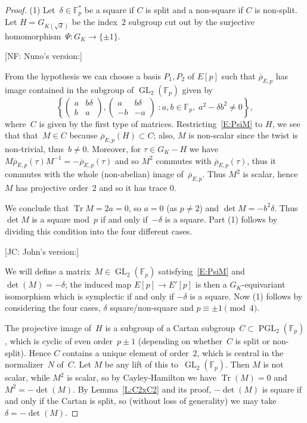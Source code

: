 \documentclass[12pt, reqno]{amsart}
\newcommand{\F}{\mathbb{F}}
\newcommand{\rhobar}{{\overline{\rho}}}
\DeclareMathOperator{\Tr}{Tr}
\newcommand{\GL}{\operatorname{GL}}
\newcommand{\PGL}{\operatorname{PGL}}
\numberwithin{equation}{section}
\theoremstyle{definition}
\theoremstyle{remark}
\newcommand{\nf}[1]{{\color{blue} \textsf{[NF: #1]}}}
\newcommand{\jc}[1]{{\color{darkgreen} \textsf{[JC: #1]}}}
\begin{document}
\begin{proof} (1)
Let~$\delta \in \F_p^*$ be a square if $C$ is split and a non-square
if $C$ is non-split.  Let $H=G_{K(\sqrt{d})}$ be the index~$2$
subgroup cut out by the surjective homomorphism~$\Psi:G_K\to\{\pm1\}$.

\nf{Nuno's version:}

From the hypothesis we can 
choose a basis $P_1, P_2$ of $E[p]$ such that 
$\rhobar_{E,p}$ has image 
contained in the subgroup of $\GL_2(\F_p)$ given by 
\[
\left\{ 
\begin{pmatrix}
a & b\delta \\
b & a
\end{pmatrix}, 
\begin{pmatrix}
a & b\delta \\
-b & -a
\end{pmatrix}  \; : a, b \in \F_p, \; a^2 - \delta b^2 \neq 0 \right\},
\]
where~$C$ is given by the first type of matrices. 
Restricting~\eqref{E:PsiM} to $H$, we see that 
that~$M \in C$ because $\rhobar_{E,p}(H) \subset C$; also, $M$ 
is non-scalar since the twist is non-trivial,
thus~$b \neq 0$. 
Moreover, for $\tau \in G_K - H$ we have 
$M \rhobar_{E,p}(\tau) M^{-1} =-\rhobar_{E,p}(\tau)$ and so $M^2$ commutes with 
$\rhobar_{E,p}(\tau)$, thus it commutes with the whole (non-abelian) image 
of~$\rhobar_{E,p}$. Thus $M^2$ is scalar, hence 
$M$ has projective order~$2$ and so it has trace 0.

We conclude that $\Tr M = 2a = 0$, so $a=0$ (as $p \neq 2$) and $\det
M = -b^2\delta$. Thus $\det M$ is a square mod~$p$ if and only
if~$-\delta$ is a square. Part (1) follows by dividing this condition
into the four different cases.

\jc{John's version:}

We will define a matrix~$M\in\GL_2(\F_p)$ satisfying~\eqref{E:PsiM}
and $\det(M)=-\delta$; the induced map $E[p]\to E'[p]$ is then a
$G_K$-equivariant isomorphism which is symplectic if and only if
$-\delta$ is a square.  Now (1) follows by considering the four cases,
$\delta$ square/non-square and $p\equiv\pm1\pmod4$.

The projective image of~$H$ is a subgroup of a Cartan
subgroup~$C\subset\PGL_2(\F_p)$, which is cyclic of even order~$p\pm1$
(depending on whether~$C$ is split or non-split).  Hence $C$ contains
a unique element of order~$2$, which is central in the normalizer~$N$
of~$C$.  Let $M$ be any lift of this to~$\GL_2(\F_p)$.  Then $M$ is
not scalar, while $M^2$ is scalar, so by Cayley-Hamilton we have
$\Tr(M)=0$ and $M^2=-\det(M)$.  By Lemma~\ref{L:C2xC2} and its proof,
$-\det(M)$ is square if and only if the Cartan is split, so (without
loss of generality) we may take $\delta=-\det(M)$.


\end{proof}
\end{document}
